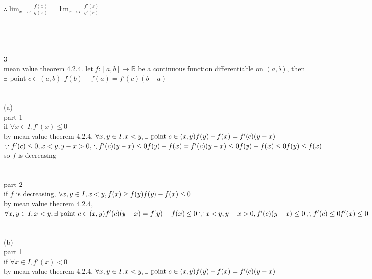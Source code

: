 \documentclass[12pt, border = 4pt, multi]{article} %
\begin{document}
$\therefore \lim_{x \rightarrow c} \frac{f(x)}{g(x)} = \lim_{x \rightarrow c}\frac{f'(x)}{g'(x)}$\\
\\
\\
\\
\\
3\\
mean value theorem 4.2.4. let $f: [a, b] \rightarrow \mathbb{R}$ be a continuous function differentiable on $(a, b)$, then $\exists \text{ point } c \in (a, b), f(b) - f(a) = f'(c)(b - a)$\\
\\
\\
(a)\\
part 1\\
if $\forall x \in I, f'(x) \leq 0$\\
by mean value theorem 4.2.4, $\forall x, y \in I, x < y, \exists \text{ point } c \in (x, y)\\
f(y) - f(x) = f'(c)(y - x)$\\
$\because f'(c) \leq 0, x < y, y - x > 0, \therefore f'(c)(y - x) \leq 0\\
f(y) - f(x) = f'(c)(y - x) \leq 0\\
f(y) - f(x) \leq 0\\
f(y) \leq f(x)$\\
so $f$ is decreasing\\
\\
\\
part 2\\
if $f$ is decreasing, $\forall x, y \in I, x < y, f(x) \geq f(y)\\
f(y) - f(x) \leq 0$\\
by mean value theorem 4.2.4, $\forall x, y \in I, x < y, \exists \text{ point } c \in (x, y)\\
f'(c)(y - x) = f(y) - f(x) \leq 0\\
\because x < y, y - x > 0, f'(c)(y - x) \leq 0\\
\therefore f'(c) \leq 0\\
f'(x) \leq 0\\$
\\
\\
\\
(b)\\
part 1\\
if $\forall x \in I, f'(x) < 0$\\
by mean value theorem 4.2.4, $\forall x, y \in I, x < y, \exists \text{ point } c \in (x, y)\\
f(y) - f(x) = f'(c)(y - x)$\\
\end{document}
